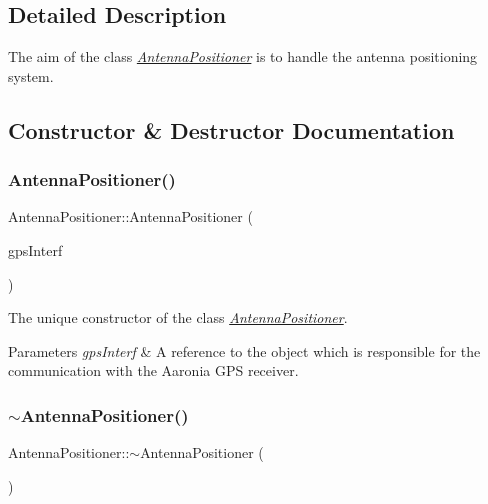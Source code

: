 \subsection{Detailed Description}
The aim of the class {\itshape \hyperlink{classAntennaPositioner}{Antenna\+Positioner}} is to handle the antenna positioning system. 

\subsection{Constructor \& Destructor Documentation}
\mbox{\label{classAntennaPositioner_ad7e864f6073421c98585c64802a3e78e}} 
\subsubsection{\texorpdfstring{Antenna\+Positioner()}{AntennaPositioner()}}
{\footnotesize\ttfamily Antenna\+Positioner\+::\+Antenna\+Positioner (\begin{DoxyParamCaption}\item[{\hyperlink{classGPSInterface}{G\+P\+S\+Interface} \&}]{gps\+Interf }\end{DoxyParamCaption})}



The unique constructor of the class {\itshape \hyperlink{classAntennaPositioner}{Antenna\+Positioner}}. 


\begin{DoxyParams}{Parameters}
{\em gps\+Interf} & A reference to the object which is responsible for the communication with the Aaronia G\+PS receiver. \\
\hline
\end{DoxyParams}
\mbox{\label{classAntennaPositioner_a7a3a48b1aab43b9a43b664567a8c5829}} 
\subsubsection{\texorpdfstring{$\sim$\+Antenna\+Positioner()}{~AntennaPositioner()}}
{\footnotesize\ttfamily Antenna\+Positioner\+::$\sim$\+Antenna\+Positioner (\begin{DoxyParamCaption}{ }\end{DoxyParamCaption})\hspace{0.3cm}{\ttfamily [inline]}}



